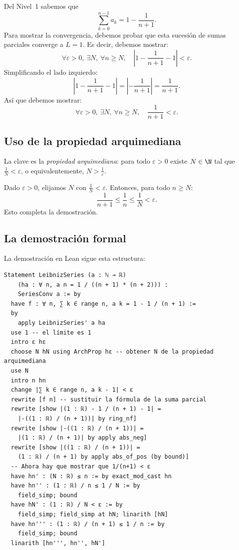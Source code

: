 Del Nivel~1 sabemos que
\[
  \sum_{k=0}^{n-1} a_k = 1 - \frac{1}{n+1} .
\]
Para mostrar la convergencia, debemos probar que esta sucesión de sumas parciales converge a $L = 1$. Es decir, debemos mostrar:
\[
  \forall \varepsilon > 0,\ \exists N,\ \forall n \ge N,\quad \left| 1 - \frac{1}{n+1} - 1 \right| < \varepsilon .
\]
Simplificando el lado izquierdo:
\[
  \left| 1 - \frac{1}{n+1} - 1 \right| = \left| -\frac{1}{n+1} \right| = \frac{1}{n+1} .
\]
Así que debemos mostrar:
\[
  \forall \varepsilon > 0,\ \exists N,\ \forall n \ge N,\quad \frac{1}{n+1} < \varepsilon .
\]

\subsection{Uso de la propiedad arquimediana}

La clave es la \emph{propiedad arquimediana}: para todo $\varepsilon > 0$ existe $N \in \N$ tal que $\frac1N < \varepsilon$, o equivalentemente, $N > \frac1\varepsilon$.

Dado $\varepsilon > 0$, elijamos $N$ con $\frac1N < \varepsilon$. Entonces, para todo $n \ge N$:
\[
  \frac{1}{n+1} \le \frac1n \le \frac1N < \varepsilon .
\]
Esto completa la demostración.

\subsection{La demostración formal}

La demostración en Lean sigue esta estructura:

\begin{verbatim}
Statement LeibnizSeries (a : ℕ → ℝ)
    (ha : ∀ n, a n = 1 / ((n + 1) * (n + 2))) :
    SeriesConv a := by
  have f : ∀ n, ∑ k ∈ range n, a k = 1 - 1 / (n + 1) :=
  by
    apply LeibnizSeries' a ha
  use 1 -- el límite es 1
  intro ε hε
  choose N hN using ArchProp hε -- obtener N de la propiedad arquimediana
  use N
  intro n hn
  change |∑ k ∈ range n, a k - 1| < ε
  rewrite [f n] -- sustituir la fórmula de la suma parcial
  rewrite [show |(1 : ℝ) - 1 / (n + 1) - 1| =
    |-((1 : ℝ) / (n + 1))| by ring_nf]
  rewrite [show |-((1 : ℝ) / (n + 1))| =
    |(1 : ℝ) / (n + 1)| by apply abs_neg]
  rewrite [show |((1 : ℝ) / (n + 1))| =
    (1 : ℝ) / (n + 1) by apply abs_of_pos (by bound)]
  -- Ahora hay que mostrar que 1/(n+1) < ε
  have hn' : (N : ℝ) ≤ n := by exact_mod_cast hn
  have hn'' : (1 : ℝ) / n ≤ 1 / N := by
    field_simp; bound
  have hN' : (1 : ℝ) / N < ε := by
    field_simp; field_simp at hN; linarith [hN]
  have hn''' : (1 : ℝ) / (n + 1) ≤ 1 / n := by
    field_simp; bound
  linarith [hn''', hn'', hN']
\end{verbatim}

